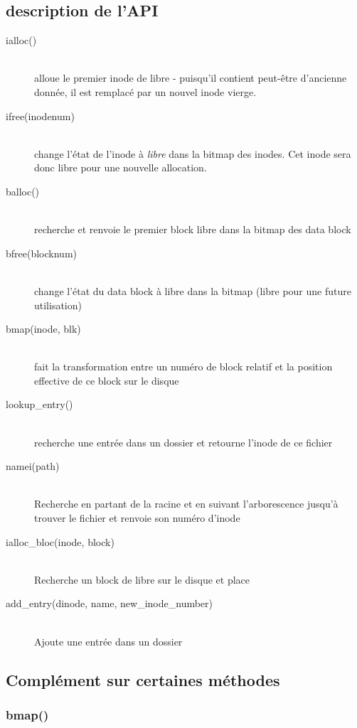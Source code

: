 \documentclass[a4paper,12pt]{article}
\begin{document}
\subsection{description de l'API}


\begin{description}
\item[ialloc()] \hfill \\
	alloue le premier inode de libre - puisqu'il contient peut-être d'ancienne donnée, il est remplacé par un nouvel inode vierge.
\item[ifree(inodenum)] \hfill \\
	change l'état de l'inode à \emph{libre} dans la bitmap des inodes. Cet inode sera donc libre pour une nouvelle allocation.
\item[balloc()] \hfill \\
	recherche et renvoie le premier block libre dans la bitmap des data block
\item[bfree(blocknum)] \hfill \\
	change l'état du data block à libre dans la bitmap (libre pour une future utilisation)
\item[bmap(inode, blk)] \hfill \\
	fait la transformation entre un numéro de block relatif et la position effective de ce block sur le disque
\item[lookup\_entry()] \hfill \\
	recherche une entrée dans un dossier et retourne l'inode de ce fichier
\item[namei(path)] \hfill \\
	Recherche en partant de la racine et en suivant l'arborescence jusqu'à trouver le fichier et renvoie son numéro d'inode
\item[ialloc\_bloc(inode, block)] \hfill \\
	Recherche un block de libre sur le disque et place 
\item[add\_entry(dinode, name, new\_inode\_number)] \hfill \\
	Ajoute une entrée dans un dossier
\end{description}


\subsection{Complément sur certaines méthodes}

\subsubsection*{bmap()}
\end{document}
